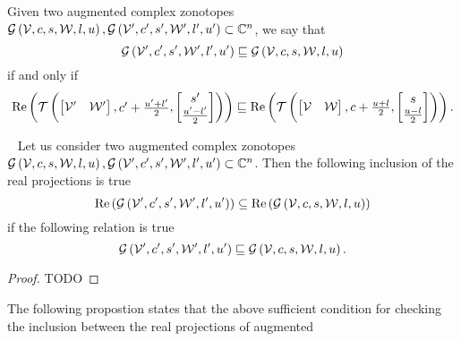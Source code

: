 \begin{definition}
Given two augmented complex zonotopes $\mathcal{G}\left(\mathcal{V},c,s,\mathcal{W},l,u\right),
\mathcal{G}\left(\mathcal{V}^\prime,c^\prime,s^\prime,\mathcal{W}^\prime,l^\prime,u^\prime\right)\subset\mathbb{C}^n$,
we say that
%
\[
\mathcal{G}\left(\mathcal{V}^\prime,c^\prime,s^\prime,\mathcal{W}^\prime,l^\prime,u^\prime\right) \sqsubseteq
 \mathcal{G}\left(\mathcal{V},c,s,\mathcal{W},l,u\right)
\]
%
if and only if
%
\[
\operatorname{Re}\left(\mathit{\operatorname{\mathcal{T}}}\left(\left[\begin{matrix}
      \mathcal{V}^\prime &
      \mathcal{W}^\prime
    \end{matrix}\right]
  ,\begin{matrix}
      c^\prime+\frac{u^\prime+l^\prime}{2}
    \end{matrix}
  ,\left[\begin{matrix}
      s^\prime\\
      \frac{u^\prime-l^\prime}{2}
    \end{matrix}\right]
  \right)
  \right)
  \sqsubseteq
  \operatorname{Re}\left(\mathit{\operatorname{\mathcal{T}}}\left(\left[\begin{matrix}
      \mathcal{V} &
      \mathcal{W}
    \end{matrix}\right]
  ,\begin{matrix}
      c+\frac{u+l}{2}
    \end{matrix}
  ,\left[\begin{matrix}
      s\\
      \frac{u-l}{2}
    \end{matrix}\right]
  \right)
  \right).
\]
%
\end{definition}
%
\begin{theorem}~\label{thm:acz-inclusion}
Let us consider two augmented complex zonotopes $\mathcal{G}\left(\mathcal{V},c,s,\mathcal{W},l,u\right),
\mathcal{G}\left(\mathcal{V}^\prime,c^\prime,s^\prime,\mathcal{W}^\prime,l^\prime,u^\prime\right)\subset\mathbb{C}^n$.
Then the following inclusion
of the real projections is true
%
\[
\operatorname{Re}\left(\mathcal{G}\left(\mathcal{V}^\prime,c^\prime,s^\prime,\mathcal{W}^\prime,l^\prime,u^\prime\right)\right)\subseteq\operatorname{Re}\left(\mathcal{G}\left(\mathcal{V},c,s,\mathcal{W},l,u\right)\right)
\]
%
if the following relation is true
%
\[
\mathcal{G}\left(\mathcal{V}^\prime,c^\prime,s^\prime,\mathcal{W}^\prime,l^\prime,u^\prime\right)\sqsubseteq\mathcal{G}\left(\mathcal{V},c,s,\mathcal{W},l,u\right).
\]
%
\end{theorem}
%
\begin{proof}
  {\color{red} TODO}
\end{proof}
%
The following propostion states that the above sufficient condition
for checking the inclusion between the real projections of augmented
